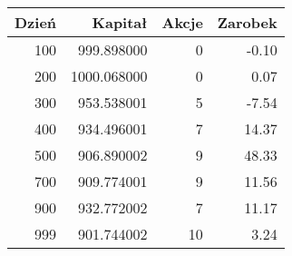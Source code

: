 \begin{tabular}{rrrr}
\toprule
 Dzień &     Kapitał &  Akcje &  Zarobek \\
\midrule
   100 &  999.898000 &      0 &    -0.10 \\
   200 & 1000.068000 &      0 &     0.07 \\
   300 &  953.538001 &      5 &    -7.54 \\
   400 &  934.496001 &      7 &    14.37 \\
   500 &  906.890002 &      9 &    48.33 \\
   700 &  909.774001 &      9 &    11.56 \\
   900 &  932.772002 &      7 &    11.17 \\
   999 &  901.744002 &     10 &     3.24 \\
\bottomrule
\end{tabular}
